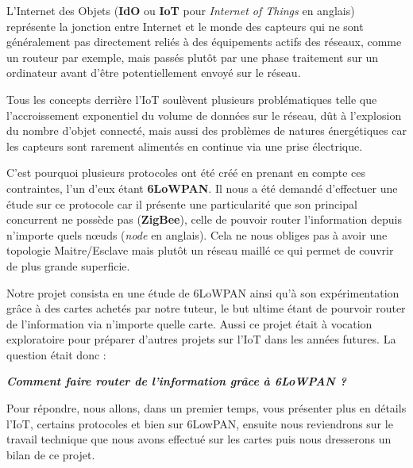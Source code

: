 
L'Internet des Objets (\textbf{IdO} ou \textbf{IoT} pour \textit{Internet of Things} en anglais) représente la jonction entre Internet et le monde des capteurs qui ne sont généralement pas directement reliés à des équipements actifs des réseaux, comme un routeur par exemple, mais passés plutôt par une phase traitement sur un ordinateur avant d'être potentiellement envoyé sur le réseau.

Tous les concepts derrière l'IoT soulèvent plusieurs problématiques telle que l'accroissement exponentiel du volume de données sur le réseau, dût à l'explosion du nombre d'objet connecté, mais aussi des problèmes de natures énergétiques car les capteurs sont rarement alimentés en continue via une prise électrique.

C'est pourquoi plusieurs protocoles ont été créé en prenant en compte ces contraintes, l'un d'eux étant \textbf{6LoWPAN}. Il nous a été demandé d'effectuer une étude sur ce protocole car il présente une particularité que son principal concurrent ne possède pas (\textbf{ZigBee}), celle de pouvoir router l'information depuis n'importe quels nœuds (\textit{node} en anglais). Cela ne nous obliges pas à avoir une topologie Maitre/Esclave mais plutôt un réseau maillé ce qui permet de couvrir de plus grande superficie.

Notre projet consista en une étude de 6LoWPAN ainsi qu'à son expérimentation grâce à des cartes achetés par notre tuteur, le but ultime étant de pourvoir router de l'information via n'importe quelle carte. Aussi ce projet était à vocation exploratoire pour préparer d'autres projets sur l'IoT dans les années futures. La question était donc :

\begin{center}
\textbf{\textit{Comment faire router de l'information grâce à 6LoWPAN ?}}
\end{center}

Pour répondre, nous allons, dans un premier temps, vous présenter plus en détails l'IoT, certains protocoles et bien sur 6LowPAN, ensuite nous reviendrons sur le travail technique que nous avons effectué sur les cartes puis nous dresserons un bilan de ce projet.
